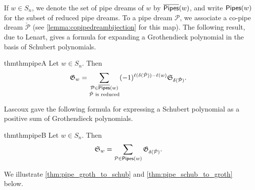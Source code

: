 \documentclass[12 pt]{amsart}
\numberwithin{equation}{section}
\theoremstyle{remark}
\newcommand{\pipes}{{\sf Pipes}}
\newcommand{\kpipes}{\overline{\sf Pipes}}
\newcommand{\demprod}{\delta}
\begin{document}
	If $w\in S_n$, we denote the set of pipe dreams of $w$ by $\kpipes(w)$, and write $\pipes(w)$ for the subset of reduced pipe dreams.
	To a pipe dream $\mathcal{P}$, we associate a co-pipe dream $\check{\mathcal{P}}$ (see \cref{lemma:copipedreambijection} for this map).
	The following result, due to Lenart, gives a formula for expanding a Grothendieck polynomial in the basis of Schubert polynomials.
	\begin{restatable}{thm}{thmpipeA}
		\label{thm:pipe_groth_to_schub}
		Let $w \in S_n$. Then
		\[\mathfrak{G}_w = \sum_{\substack{\mathcal{P} \in \kpipes(w)\\ \check{\mathcal{P}} \text{ is reduced}}}(-1)^{\ell(\demprod(\check{\mathcal{P}}))-\ell(w)}\mathfrak{S}_{\demprod(\check{\mathcal{P}})}. \]
	\end{restatable}
	Lascoux gave the following formula for expressing a Schubert polynomial as a positive sum of Grothendieck polynomials.
	\begin{restatable}{thm}{thmpipeB}
		\label{thm:pipe_schub_to_groth}
		Let $w \in S_n$. Then 
		\[\mathfrak{S}_w = \sum_{\mathcal{P} \in \pipes(w)}\mathfrak{G}_{\demprod(\check{\mathcal{P}})}.\]
	\end{restatable}
	We illustrate \cref{thm:pipe_groth_to_schub} and \cref{thm:pipe_schub_to_groth} below.
	
\end{document}
